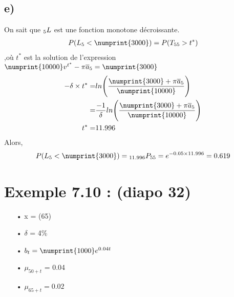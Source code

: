 \documentclass[11pt,french]{report}
\newcommand{\indiceGauche}[2]{{\vphantom{#2}}_{#1}#2}
\begin{document}
\subsection*{e)}
On sait que $\indiceGauche{5}{L}$ est une fonction monotone décroissante. 
\begin{align*}
P(L_{5} < \numprint{3000}) = P(T_{55} > t^*)
\end{align*}
,où $t^*$ est la solution de l'expression $ \numprint{10000}v^{t^*} - \pi \overline{a}_{5} = \numprint{3000}$
\begin{align*}
-\delta \times t^* =& ln \Bigg( \frac{\numprint{3000} + \pi \overline{a}_{5}}{\numprint{10000}}\Bigg) \\
=& \frac{-1}{\delta} ln \Bigg( \frac{\numprint{3000} + \pi \overline{a}_{5}}{\numprint{10000}}\Bigg) \\
t^* =& 11.996
\end{align*}
Alors, 
\begin{align*}
P(L_{5} < \numprint{3000}) = \indiceGauche{11.996}{P}_{55} = e^{-0.05 \times  11.996} = 0.619
\end{align*}

\section{Exemple 7.10 : (diapo 32)}
\begin{itemize}
\item[•] x = (65)
\item[•] $\delta$ = 4\%
\item[•] $b_t = \numprint{1000}e^{0.04t}$
\item[•] $\mu_{50+t}$ = 0.04
\item[•] $\mu_{65 + t} = 0.02$
\end{itemize}
\end{document}
